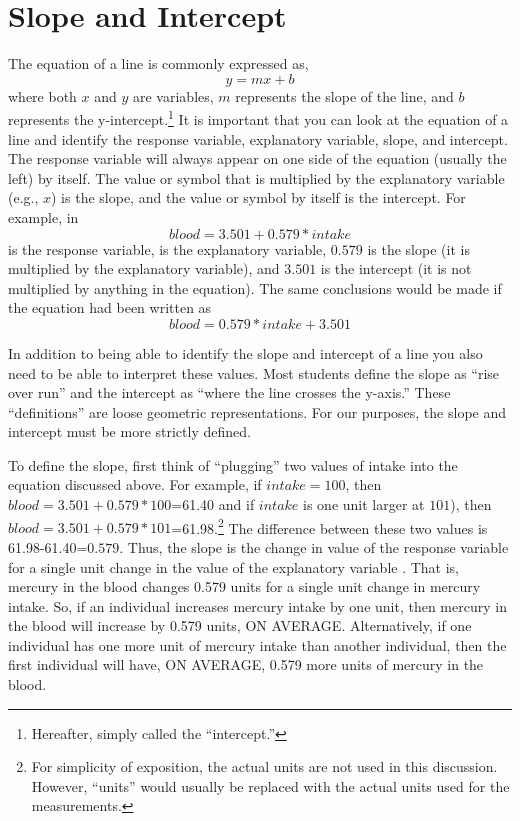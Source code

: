 \documentclass[10pt,openany]{book}\usepackage[]{graphicx}\usepackage[]{color}
\begin{document}
\section{Slope and Intercept}
The equation of a line is commonly expressed as,
  \[ y = mx + b  \]
where both $x$ and $y$ are variables, $m$ represents the slope of the line, and $b$ represents the y-intercept.\footnote{Hereafter, simply called the ``intercept.''}  It is important that you can look at the equation of a line and identify the response variable, explanatory variable, slope, and intercept. The response variable will always appear on one side of the equation (usually the left) by itself.  The value or symbol that is multiplied by the explanatory variable (e.g., $x$) is the slope, and the value or symbol by itself is the intercept. For example, in
\[ blood = 3.501 + 0.579*intake \]
 is the response variable,  is the explanatory variable, $0.579$ is the slope (it is multiplied by the explanatory variable), and $3.501$ is the intercept (it is not multiplied by anything in the equation). The same conclusions would be made if the equation had been written as
  \[ blood = 0.579*intake+3.501 \]


In addition to being able to identify the slope and intercept of a line you also need to be able to interpret these values. Most students define the slope as ``rise over run'' and the intercept as ``where the line crosses the y-axis.''  These ``definitions'' are loose geometric representations. For our purposes, the slope and intercept must be more strictly defined.

To define the slope, first think of ``plugging'' two values of intake into the equation discussed above. For example, if $intake=100$, then $blood=3.501+0.579*100$=61.40 and if $intake$ is one unit larger at $101$), then $blood=3.501+0.579*101$=61.98.\footnote{For simplicity of exposition, the actual units are not used in this discussion. However, ``units'' would usually be replaced with the actual units used for the measurements.} The difference between these two values is 61.98-61.40=$0.579$. Thus, the slope is the change in value of the response variable for a single unit change in the value of the explanatory variable . That is, mercury in the blood changes 0.579 units for a single unit change in mercury intake. So, if an individual increases mercury intake by one unit, then mercury in the blood will increase by 0.579 units, ON AVERAGE. Alternatively, if one individual has one more unit of mercury intake than another individual, then the first individual will have, ON AVERAGE, 0.579 more units of mercury in the blood.
\end{document}

